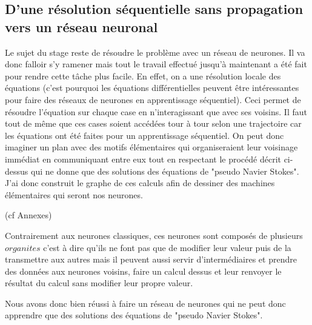 \documentclass[10pt]{article}
\begin{document}
\subsection{D'une résolution séquentielle sans propagation vers un réseau neuronal}
Le sujet du stage reste de résoudre le problème avec un réseau de neurones. Il va donc falloir s'y ramener mais tout le travail effectué jusqu'à maintenant a été fait pour rendre cette tâche plus facile. En effet, on a une résolution locale des équations (c'est pourquoi les équations différentielles peuvent être intéressantes pour faire des réseaux de neurones en apprentissage séquentiel). Ceci permet de résoudre l'équation sur chaque case en n'interagissant que avec ses voisins. Il faut tout de même que ces cases soient accédées tour à tour selon une trajectoire car les équations ont été faites pour un apprentissage séquentiel. On peut donc imaginer un plan avec des motifs élémentaires qui organiseraient leur voisinage immédiat en communiquant entre eux tout en respectant le procédé décrit ci-dessus qui ne donne que des solutions des équations de "pseudo Navier Stokes". J'ai donc construit le graphe de ces calculs afin de dessiner des machines élémentaires qui seront nos neurones.

(cf Annexes)

Contrairement aux neurones classiques, ces neurones sont composés de plusieurs $\textit{organites}$ c'est à dire qu'ils ne font pas que de modifier leur valeur puis de la transmettre aux autres mais il peuvent aussi servir d'intermédiaires et prendre des données aux neurones voisins, faire un calcul dessus et leur renvoyer le résultat du calcul sans modifier leur propre valeur.

Nous avons donc bien réussi à faire un réseau de neurones qui ne peut donc apprendre que des solutions des équations de "pseudo Navier Stokes".
\end{document}
